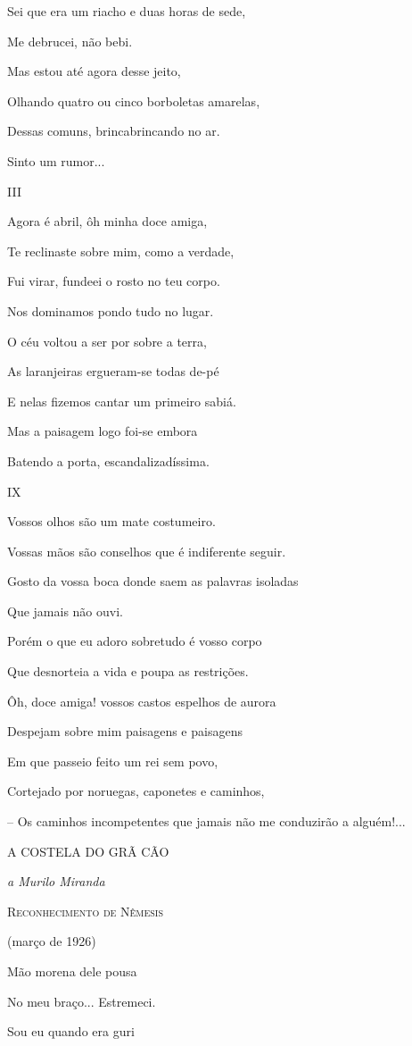 Sei que era um riacho e duas horas de sede,

Me debrucei, não bebi.

Mas estou até agora desse jeito,

Olhando quatro ou cinco borboletas amarelas,

Dessas comuns, brincabrincando no ar.

Sinto um rumor...

III

Agora é abril, ôh minha doce amiga,

Te reclinaste sobre mim, como a verdade,

Fui virar, fundeei o rosto no teu corpo.

Nos dominamos pondo tudo no lugar.

O céu voltou a ser por sobre a terra,

As laranjeiras ergueram-se todas de-pé

E nelas fizemos cantar um primeiro sabiá.

Mas a paisagem logo foi-se embora

Batendo a porta, escandalizadíssima.

IX

Vossos olhos são um mate costumeiro.

Vossas mãos são conselhos que é indiferente seguir.

Gosto da vossa boca donde saem as palavras isoladas

Que jamais não ouvi.

Porém o que eu adoro sobretudo é vosso corpo

Que desnorteia a vida e poupa as restrições.

Ôh, doce amiga! vossos castos espelhos de aurora

Despejam sobre mim paisagens e paisagens

Em que passeio feito um rei sem povo,

Cortejado por noruegas, caponetes e caminhos,

-- Os caminhos incompetentes que jamais não me conduzirão a alguém!...

\textsc{A COSTELA DO GRÃ CÃO}

\emph{a Murilo Miranda}

\textsc{Reconhecimento de Nêmesis}

(março de 1926)

Mão morena dele pousa

No meu braço... Estremeci.

Sou eu quando era guri

